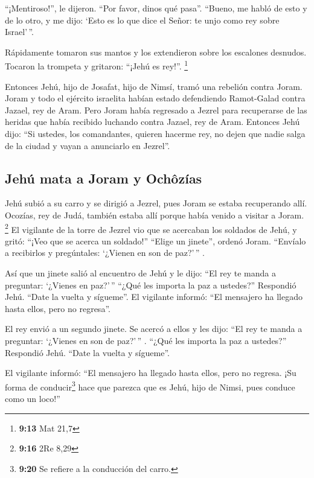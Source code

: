  ``¡Mentiroso!'', le dijeron. ``Por favor, dinos qué
pasa''. ``Bueno, me habló de esto y de lo otro, y me dijo: `Esto es lo
que dice el Señor: te unjo como rey sobre Israel'\,''.

 Rápidamente tomaron sus mantos y los extendieron sobre
los escalones desnudos. Tocaron la trompeta y gritaron: ``¡Jehú es
rey!''. \footnote{\textbf{9:13} Mat 21,7}

 Entonces Jehú, hijo de Josafat, hijo de Nimsí, tramó una
rebelión contra Joram. Joram y todo el ejército israelita habían estado
defendiendo Ramot-Galad contra Jazael, rey de Aram.  Pero
Joram había regresado a Jezrel para recuperarse de las heridas que había
recibido luchando contra Jazael, rey de Aram. Entonces Jehú dijo: ``Si
ustedes, los comandantes, quieren hacerme rey, no dejen que nadie salga
de la ciudad y vayan a anunciarlo en Jezrel''.

\hypertarget{jehuxfa-mata-a-joram-y-ochuxf4zuxedas}{%
\subsection{Jehú mata a Joram y
Ochôzías}\label{jehuxfa-mata-a-joram-y-ochuxf4zuxedas}}

 Jehú subió a su carro y se dirigió a Jezrel, pues Joram
se estaba recuperando allí. Ocozías, rey de Judá, también estaba allí
porque había venido a visitar a Joram. \footnote{\textbf{9:16} 2Re 8,29}
 El vigilante de la torre de Jezrel vio que se acercaban
los soldados de Jehú, y gritó: ``¡Veo que se acerca un soldado!''
``Elige un jinete'', ordenó Joram. ``Envíalo a recibirlos y pregúntales:
`¿Vienen en son de paz?'\,'' .

 Así que un jinete salió al encuentro de Jehú y le dijo:
``El rey te manda a preguntar: `¿Vienes en paz?'\,'' ``¿Qué les importa
la paz a ustedes?'' Respondió Jehú. ``Date la vuelta y sígueme''. El
vigilante informó: ``El mensajero ha llegado hasta ellos, pero no
regresa''.

 El rey envió a un segundo jinete. Se acercó a ellos y
les dijo: ``El rey te manda a preguntar: `¿Vienes en son de paz?'\,'' .
``¿Qué les importa la paz a ustedes?'' Respondió Jehú. ``Date la vuelta
y sígueme''.

 El vigilante informó: ``El mensajero ha llegado hasta
ellos, pero no regresa. ¡Su forma de conducir\footnote{\textbf{9:20} Se
  refiere a la conducción del carro.} hace que parezca que es Jehú, hijo
de Nimsi, pues conduce como un loco!''

